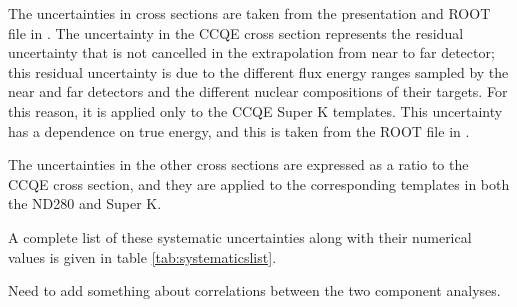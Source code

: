 \begin{itemize}
The uncertainties in cross sections are taken from the presentation and ROOT file in \cite{NIWGErrors}. The uncertainty in the CCQE cross 
section represents the residual uncertainty that is not cancelled in the extrapolation from near to far detector; this residual 
uncertainty is due to the different flux energy ranges sampled by the near and far detectors and the different nuclear compositions of 
their targets. For this reason, it is applied only to the CCQE Super K templates. This uncertainty has a dependence on true energy, and this 
is taken from the ROOT file in \cite{NIWGErrors}.

The uncertainties in the other cross sections are expressed as a ratio to the CCQE cross section, and they are applied to the 
corresponding templates in both the ND280 and Super K. 

\end{itemize}

A complete list of these systematic uncertainties along with their numerical values is given in table \ref{tab:systematicslist}.


{\color{red} Need to add something about correlations between the two component analyses. }

